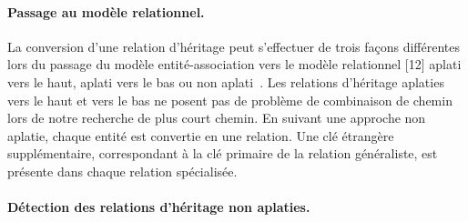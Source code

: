 \paragraph*{Passage au modèle relationnel.}

La conversion d'une relation d'héritage peut s'effectuer de trois façons différentes lors du passage du modèle entité-association vers le modèle relationnel [12] aplati vers le haut, aplati vers le bas ou non aplati~\cite{elmasri_2006}. Les relations d'héritage aplaties vers le haut et vers le bas ne posent pas de problème de combinaison de chemin lors de notre recherche de plus court chemin. En suivant une approche non aplatie, chaque entité est convertie en une relation.  Une clé étrangère supplémentaire, correspondant à la clé primaire de la relation généraliste, est présente dans chaque relation spécialisée. 


%

\paragraph*{Détection des relations d'héritage non aplaties.}

